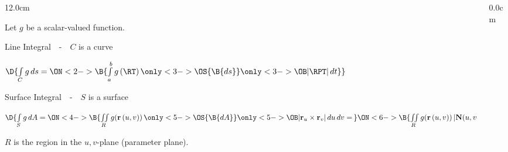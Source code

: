 \begin{frame}
\begin{columns}\begin{column}{12.0cm}
\scriptsize

\vspace{0.2cm}

Let $g$ be a scalar-valued function.

\vspace{0.7cm}

Line Integral \,\, - \,\, $C$ is a curve

\begin{center}
	$\D{\int \limits_{C} g \, ds = 
	\ON<2->{\B{\int \limits_{a}^{b} g\,(\RT)\, 
	\only<3->{\OS{\B{ ds }}}{
	\only<3->{\OB}{ |\RPT| \, dt }}}}}$
\end{center}

\vspace{0.2cm}

Surface Integral \,\, - \,\, $S$ is a surface

\begin{center}
	$\D{\int \limits_{S} g \, dA = 
	\ON<4->{\B{\iint \limits_{R} g({\bf r}\,(u,v)) \, \only<5->{\OS{\B{ dA }}}{\only<5->{\OB}{ |{\bf r}_u \times {\bf r}_v| \, du \, dv }} = \,}}
	\ON<6->{\B{\iint \limits_{R} g({\bf r}\,(u,v)) \, |{\bf N}(u,v)| \, du \, dv}}}$
\end{center}

\vspace{0.5cm}

$R$ is the region in the $u,v$-plane (parameter plane).

\vspace{1.2cm}

\end{column}\begin{column}{0.0cm}\end{column}\end{columns}
\end{frame}

